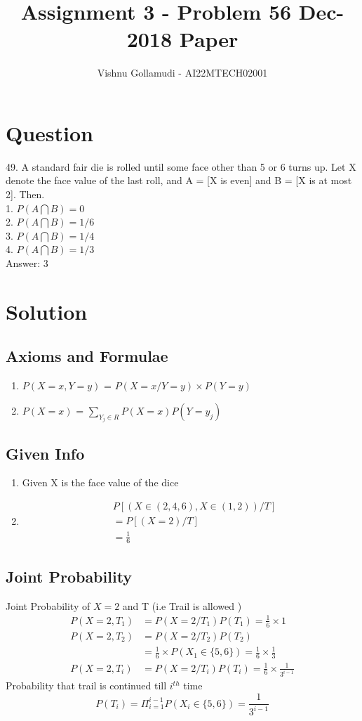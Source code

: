 \documentclass{article}
\title{Assignment 3 - Problem 56 Dec-2018 Paper}
\author{Vishnu Gollamudi - AI22MTECH02001}
\begin{document}
\section{Question}
49. A standard fair die is rolled until some face other than 5 or 6 turns up. Let X denote the face value of the last roll, and A = [X is even] and B = [X is at most 2]. Then.\\
1. $P(A \bigcap B) = 0$ \\
2. $P(A \bigcap B) = 1/6$ \\
3. $P(A \bigcap B) = 1/4$ \\ 
4. $P(A \bigcap B) = 1/3$ \\

Answer: 3

\section{Solution}

\subsection{Axioms and Formulae}

\begin{enumerate}
    \item $P(X=x,Y=y)$ = $P(X=x/Y=y) \times P(Y=y)$
    \item $P(X=x)$ = $\sum_{Y_j\in R} P(X=x) P(Y=y_j)$  
\end{enumerate}

\subsection{Given Info}
\begin{enumerate}
    \item Given X is the face value of the dice\\
\item 
\begin{align*}
&  P[(X \in (2,4,6), X \in (1,2))/T] \\
&= P[(X = 2)/T] \\
&= \frac{1}{6} 
\end{align*}
\end{enumerate}

\subsection{Joint Probability}
Joint Probability of $X=2$ and T (i.e Trail is allowed )
\begin{align*}
P(X=2,T_1) &= P(X=2/T_1)  P(T_1) = \frac{1}{6} \times 1 \\
P(X=2,T_2) &= P(X=2/T_2)  P(T_2) \\
           &=\frac{1}{6} \times P(X_1 \in \{5,6\} ) = \frac{1}{6} \times \frac{1}{3}\\
P(X=2,T_i) &= P(X=2/T_i) P(T_i) = \frac{1}{6} \times \frac{1}{3^{i-1}}
\end{align*}
Probability that trail is continued till $i^{th}$ time 
\begin{equation*}
    P(T_i) = \Pi_{i=1}^{i-1} P(X_i \in \{5,6\})= \frac{1}{3^{i-1}}
\end{equation*}
\end{document}
